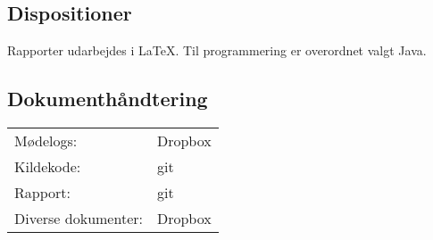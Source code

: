 \subsection{Dispositioner}
Rapporter udarbejdes i \LaTeX. Til programmering er overordnet valgt Java.

\subsection{Dokumenthåndtering}
\begin{center}
\begin{tabular}{l l}
	Mødelogs:			& Dropbox \\
	Kildekode:			& git \\
	Rapport:			& git \\
	Diverse dokumenter:	& Dropbox
\end{tabular}
\end{center}
